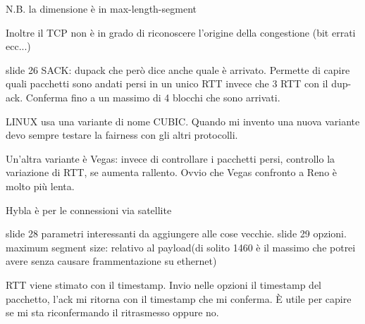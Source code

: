 \documentclass{article}
\begin{document}
N.B. la dimensione è in max-length-segment

Inoltre il TCP non è in grado di riconoscere l'origine della congestione (bit errati ecc...)

slide 26
SACK: dupack che però dice anche quale è arrivato. Permette di capire quali pacchetti sono andati persi in un unico RTT invece che 3 RTT 
con il dup-ack. Conferma fino a un massimo di 4 blocchi che sono arrivati.

LINUX usa una variante di nome CUBIC. Quando mi invento una nuova variante devo sempre testare la fairness con gli altri protocolli.

Un'altra variante è Vegas: invece di controllare i pacchetti persi, controllo la variazione di RTT, se aumenta rallento. Ovvio che Vegas 
confronto a Reno è molto più lenta.

Hybla è per le connessioni via satellite

slide 28 parametri interessanti da aggiungere alle cose vecchie.
slide 29 opzioni.
maximum segment size: relativo al payload(di solito 1460 è il massimo che potrei avere senza causare frammentazione su ethernet)

RTT viene stimato con il timestamp. Invio nelle opzioni il timestamp del pacchetto, l'ack mi ritorna con il timestamp che mi conferma. 
È utile per capire se mi sta riconfermando il ritrasmesso oppure no.
\end{document}
